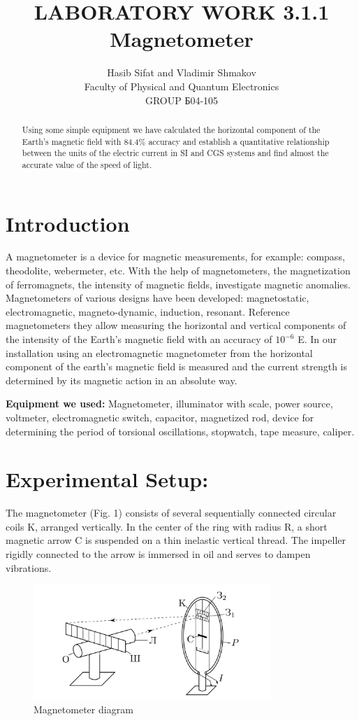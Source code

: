 \documentclass[a4paper, 12pt]{article}%
\author{Hasib Sifat and Vladimir Shmakov \\
Faculty of Physical and Quantum Electronics \\
GROUP Б04-105}
\title{\textbf{LABORATORY WORK 3.1.1 \\ 
Magnetometer}}
\begin{document}
\maketitle

\begin{abstract}
Using some simple equipment we have calculated the horizontal component of the Earth's magnetic field with $84.4 \%$ accuracy and establish a quantitative relationship between the units of the electric current in SI and CGS systems and find almost the accurate value of the speed of light.
\end{abstract}

\section{Introduction} A magnetometer is a device for magnetic measurements, for example: compass, theodolite, webermeter, etc. With the help of magnetometers, the magnetization of ferromagnets, the intensity of magnetic fields, investigate magnetic anomalies. Magnetometers
of various designs have been developed: magnetostatic, electromagnetic, magneto-dynamic, induction, resonant. Reference magnetometers they allow measuring the horizontal and vertical components of the intensity of the Earth's magnetic field with an accuracy of $10^{-6}$ E. In our installation using an electromagnetic magnetometer from the horizontal component of the earth's magnetic field is measured and the current strength is determined by its magnetic action in an absolute way.

\textbf{Equipment we used:} Magnetometer, illuminator with scale,
power source, voltmeter, electromagnetic switch, capacitor, magnetized rod, device for determining the period of torsional oscillations, stopwatch, tape measure, caliper.
 

\section{Experimental Setup:} The magnetometer (Fig. 1) consists of several sequentially connected circular coils K, arranged vertically. In the center of the ring with radius R, a short magnetic arrow C is suspended on a thin inelastic vertical thread. The impeller rigidly connected to the arrow is immersed in oil and serves to dampen vibrations.\\
\begin{figure}[h]
\begin{center}
\includegraphics[width = 0.8\textwidth]{Fig1.png}
\caption{Magnetometer diagram}
\end{center}
\end{figure}
\end{document}
